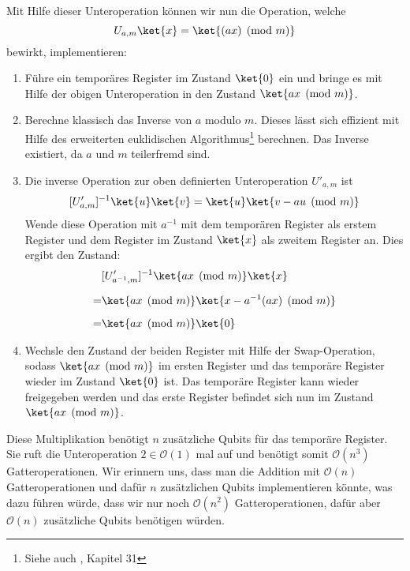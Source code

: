 \noindent Mit Hilfe dieser Unteroperation können wir nun die Operation, welche $$U_{a, m}\ket{x} = \ket{(ax) \pmod{m}}$$ bewirkt, implementieren:
\begin{enumerate}
    \item Führe ein temporäres Register im Zustand $\ket{0}$ ein und bringe es mit Hilfe der obigen Unteroperation in den Zustand $\ket{ax \pmod{m}}$.
    \item Berechne klassisch das Inverse von $a$ modulo $m$. Dieses lässt sich effizient mit Hilfe des erweiterten euklidischen Algorithmus\footnote{Siehe auch \cite{clrs}, Kapitel 31} berechnen. Das Inverse existiert, da $a$ und $m$ teilerfremd sind.
    \item Die inverse Operation zur oben definierten Unteroperation $U'_{a, m}$ ist
    $$[U'_{a, m}]^{-1}\ket{u}\ket{v} = \ket{u}\ket{v - au \pmod{m}}$$
    Wende diese Operation mit $a^{-1}$ mit dem temporären Register als erstem Register und dem Register im Zustand $\ket{x}$ als zweitem Register an. Dies ergibt den Zustand: 
    \begin{align*}
        &[U'_{a^{-1}, m}]^{-1}\ket{ax \pmod{m}}\ket{x} \\[0.2cm] = &\ket{ax \pmod{m}}\ket{x - a^{-1}(ax) \pmod{m}} \\[0.2cm] = &\ket{ax \pmod{m}}\ket{0}
    \end{align*}
    \item Wechsle den Zustand der beiden Register mit Hilfe der Swap-Operation, sodass $\ket{ax \pmod{m}}$ im ersten Register und das temporäre Register wieder im Zustand $\ket{0}$ ist. Das temporäre Register kann wieder freigegeben werden und das erste Register befindet sich nun im Zustand $\ket{ax \pmod{m}}$.
\end{enumerate}
Diese Multiplikation benötigt $n$ zusätzliche Qubits für das temporäre Register. Sie ruft die Unteroperation $2 \in \mathcal O(1)$ mal auf und benötigt somit $\mathcal O(n^3)$ Gatteroperationen. Wir erinnern uns, dass man die Addition mit $\mathcal O(n)$ Gatteroperationen und dafür $n$ zusätzlichen Qubits implementieren könnte, was dazu führen würde, dass wir nur noch $\mathcal O(n^2)$ Gatteroperationen, dafür aber $\mathcal O(n)$ zusätzliche Qubits benötigen würden.